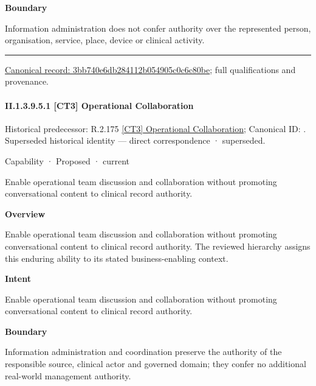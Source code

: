 \textbf{Boundary}



Information administration does not confer authority over the represented person, organisation, service, place, device or clinical activity.



\medskip\hrule\medskip

{\footnotesize \href{../../../../continuum/strategy/capability/3bb740e6db284112b054905c0c6c80be.md}{Canonical record: 3bb740e6db284112b054905c0c6c80be}; full qualifications and provenance.}\par
\paragraph*{II.1.3.9.5.1 [CT3] Operational Collaboration}
\label{navigation:II.1.3.9.5.1}

{\small Historical predecessor: R.2.175 \hyperref[element:99e9d9763ec94140b7d7642f4b5966f6]{[CT3] Operational Collaboration}; Canonical ID: \texttt{}. Superseded historical identity — direct correspondence · superseded.}\par
\label{element:631fdb8b47084008ac9b5de28b26972b}
{\small Capability · Proposed · current}\par

Enable operational team discussion and collaboration without promoting conversational content to clinical record authority.



\textbf{Overview}



Enable operational team discussion and collaboration without promoting conversational content to clinical record authority. The reviewed hierarchy assigns this enduring ability to its stated business-enabling context.



\textbf{Intent}



Enable operational team discussion and collaboration without promoting conversational content to clinical record authority.



\textbf{Boundary}



Information administration and coordination preserve the authority of the responsible source, clinical actor and governed domain; they confer no additional real-world management authority.


